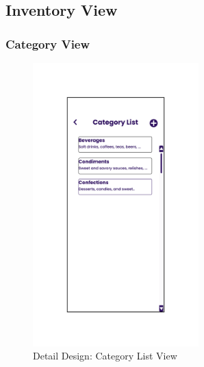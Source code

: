 \documentclass[../thesis.tex]{subfiles}
\begin{document}
\subsection{Inventory View}
\subsubsection{Category View}

\begin{figure}[H]
    \centering
    \includegraphics[width=0.57\textwidth]{images/DetailedDesign_Category_List.png}
    \caption{Detail Design: Category List View}
    \label{fig:DetailedDesign_Category_List}
\end{figure}
\end{document}

